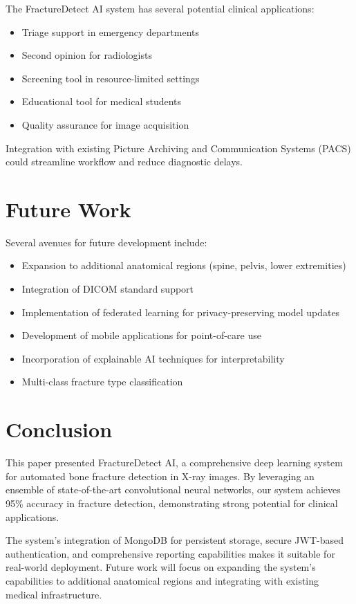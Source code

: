 \documentclass[conference]{IEEEtran}
\begin{document}
The FractureDetect AI system has several potential clinical applications:
\begin{itemize}
    \item Triage support in emergency departments
    \item Second opinion for radiologists
    \item Screening tool in resource-limited settings
    \item Educational tool for medical students
    \item Quality assurance for image acquisition
\end{itemize}

Integration with existing Picture Archiving and Communication Systems (PACS) could streamline workflow and reduce diagnostic delays.

\section{Future Work}
\label{sec:future_work}

Several avenues for future development include:
\begin{itemize}
    \item Expansion to additional anatomical regions (spine, pelvis, lower extremities)
    \item Integration of DICOM standard support
    \item Implementation of federated learning for privacy-preserving model updates
    \item Development of mobile applications for point-of-care use
    \item Incorporation of explainable AI techniques for interpretability
    \item Multi-class fracture type classification
\end{itemize}

\section{Conclusion}
\label{sec:conclusion}

This paper presented FractureDetect AI, a comprehensive deep learning system for automated bone fracture detection in X-ray images. By leveraging an ensemble of state-of-the-art convolutional neural networks, our system achieves 95\% accuracy in fracture detection, demonstrating strong potential for clinical applications.

The system's integration of MongoDB for persistent storage, secure JWT-based authentication, and comprehensive reporting capabilities makes it suitable for real-world deployment. Future work will focus on expanding the system's capabilities to additional anatomical regions and integrating with existing medical infrastructure.
\end{document}
